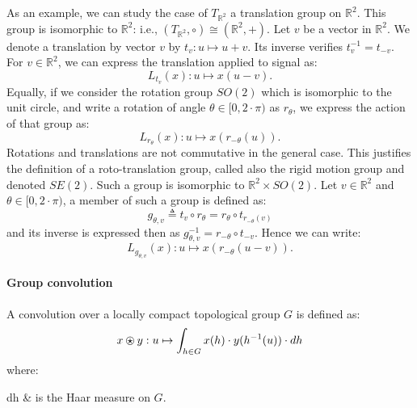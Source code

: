                 As an example, we can study the case of $T_{\mathbb{R}^2}$ a translation group on $\mathbb{R}^2$.
                This group is isomorphic to $\mathbb{R}^2$: i.e., $(T_{\mathbb{R}^2}, \circ) \cong (\mathbb{R}^2, +)$.
                Let $v$ be a vector in $\mathbb{R}^2$.
                We denote a translation by vector $v$ by $t_v: u \mapsto u + v$.
                Its inverse verifies $t_v^{-1} = t_{-v}$.
                For $v \in \mathbb{R}^2$, we can express the translation applied to signal as:
                \begin{equation}
                    \label{eq::action_translation}
                    L_{t_v}(x): u \mapsto x\left(u - v\right).
                \end{equation}
                Equally, if we consider the rotation group $SO(2)$ which is isomorphic to the unit circle, and write a rotation of angle $\theta \in [0, 2\cdot\pi)$ as $r_{\theta}$, we express the action of that group as:
                \begin{equation}
                    \label{eq::action_rotation}
                    L_{r_{\theta}}(x): u \mapsto x\left(r_{-\theta}(u)\right).
                \end{equation}
                Rotations and translations are not commutative in the general case.
                This justifies the definition of a roto-translation group, called also the rigid motion group and denoted $SE(2)$.
                Such a group is isomorphic to $\mathbb{R}^2 \times SO(2)$.
                Let $v \in \mathbb{R}^2$ and $\theta \in [0, 2\cdot\pi)$, a member of such a group is defined as:
                \begin{equation}
                    \label{eq::roto-translation}
                    g_{\theta, v} \triangleq t_v \circ r_{\theta} = r_{\theta} \circ t_{r_{-\theta}(v)}
                \end{equation}
                and its inverse is expressed then as $g_{\theta, v}^{-1} = r_{-\theta} \circ t_{-v}$.
                Hence we can write:
                \begin{equation}
                    \label{eq::action_roto-translation}
                    L_{g_{\theta, v}}(x): u \mapsto x \left(r_{-\theta}(u - v)\right).
                \end{equation}
            
            \paragraph{Group convolution}
                A convolution over a locally compact topological group $G$ is defined as:
                \begin{equation}
                    \label{eq::group_signal_convolution}
                    x \ostar y: u \mapsto \int_{h\in G} x(h)\cdot y(h^{-1}(u)) \cdot dh
                \end{equation}
                where:
                \begin{conditions}
                    dh & is the Haar measure on $G$.
                \end{conditions}

